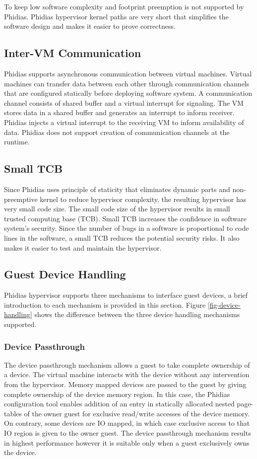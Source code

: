 To keep low software complexity and footprint preemption is not supported by Phidias.
Phidias hypervisor kernel paths are very short that simplifies the software design and makes it easier to prove correctness.

\subsection{Inter-VM Communication}
Phidias supports asynchronous communication between virtual machines.
Virtual machines can transfer data between each other through communication channels that
are configured statically before deploying software system.
A communication channel consists of shared buffer and a virtual interrupt for signaling.
The VM stores data in a shared buffer and generates an interrupt to inform receiver.
Phidias injects a virtual interrupt to the receiving VM to inform availability of data.
Phidias does not support creation of communication channels at the runtime.

\subsection{Small TCB}
Since Phidias uses principle of staticity that eliminates dynamic parts and non-preemptive
kernel to reduce hypervisor complexity, the resulting hypervisor has very small code size.
The small code size of the hypervisor results in small trusted computing base (TCB).
Small TCB increases the confidence in software system's security.
Since the number of bugs in a software is proportional to code lines in the software\cite{lipow1982number}, 
a small TCB reduces the potential security risks.
It also makes it easier to test and maintain the hypervisor.


\subsection{Guest Device Handling} 
Phidias hypervisor supports three mechanisms to interface guest devices, a brief introduction to each mechanism is provided in this section.
Figure \ref{fig-device-handling} shows the difference between the three device handling mechanisms supported.


\subsubsection{Device Passthrough}
The device passthrough mechanism allows a guest to take complete ownership of a device. 
The virtual machine interacts with the device without any intervention from the hypervisor.
Memory mapped devices are passed to the guest by giving complete ownership of the device memory region. 
In this case, the Phidias configuration tool enables addition of an entry in statically allocated nested page-tables of the owner guest 
for exclusive read/write accesses of the device memory.
On contrary, some devices are IO mapped, in which case exclusive access to that IO region is given to the owner guest.
The device passthrough mechanism results in highest performance however it is suitable only when a guest exclusively owns the device.

